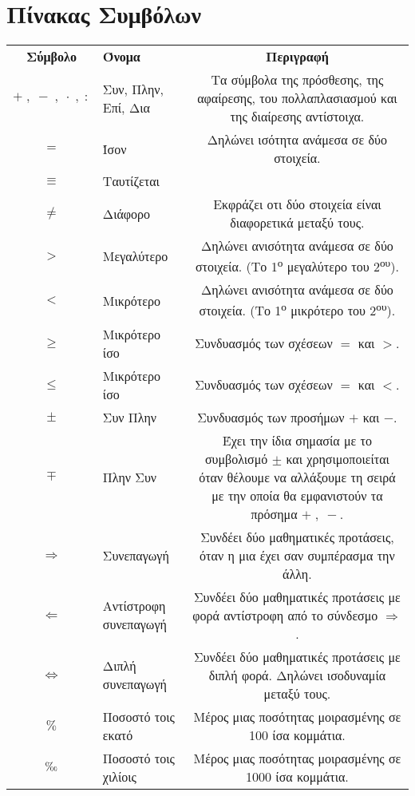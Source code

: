 \documentclass[twoside,10pt]{book}
\DeclareRobustCommand{\perthousand}{%
\ifmmode
\text{\textperthousand}%
\else
\textperthousand
\fi}
\begin{document}
\chapter*{Πίνακας Συμβόλων}
{\par\centering

\begin{tabularx}{\textwidth}{c>{\centering}m{3.1cm}C}
\hline\rule[-2ex]{0pt}{5.5ex}\textbf{Σύμβολο} & \textbf{Όνομα} & \textbf{Περιγραφή}\\
\hhline{===}\rule[-2ex]{0pt}{8.5ex}
$ +\;,\; -\;,\; \cdot\;,\; : $ &  Συν, Πλην, Επί, Δια & Τα σύμβολα της πρόσθεσης, της αφαίρεσης, του πολλαπλασιασμού και της διαίρεσης αντίστοιχα.\\
\rule[-2ex]{0pt}{5.5ex}
$ = $ & Ίσον & Δηλώνει ισότητα ανάμεσα σε δύο στοιχεία.\\
\rule[-2ex]{0pt}{5.5ex}
$ \equiv $ & Ταυτίζεται & \\
\rule[-2ex]{0pt}{5.5ex}
$ \neq $ & Διάφορο & Εκφράζει οτι δύο στοιχεία είναι διαφορετικά μεταξύ τους.\\
\rule[-2ex]{0pt}{5.5ex}
$ > $ & Μεγαλύτερο & Δηλώνει ανισότητα ανάμεσα σε δύο στοιχεία. (Το 1\textsuperscript{ο} μεγαλύτερο του 2\textsuperscript{ου}).\\
\rule[-2ex]{0pt}{5.5ex}
$ < $ & Μικρότερο & Δηλώνει ανισότητα ανάμεσα σε δύο στοιχεία. (Το 1\textsuperscript{ο} μικρότερο του 2\textsuperscript{ου}).\\
\rule[-2ex]{0pt}{5.5ex}
$ \geq $ & Μικρότερο ίσο & Συνδυασμός των σχέσεων $=$ και $>$.\\
\rule[-2ex]{0pt}{5.5ex}
$ \leq $ & Μικρότερο ίσο & Συνδυασμός των σχέσεων $=$ και $<$.\\
\rule[-2ex]{0pt}{5.5ex}
$ \pm $ & Συν Πλην & Συνδυασμός των προσήμων $+$ και $-$.\\
\rule[-2ex]{0pt}{5.5ex}
$ \mp $ & Πλην Συν & Έχει την ίδια σημασία με το συμβολισμό $\pm$  και χρησιμοποιείται όταν θέλουμε να αλλάξουμε τη σειρά με την οποία θα εμφανιστούν τα πρόσημα $+\;,\;-$. \\
\rule[-2ex]{0pt}{7ex}
$ \Rightarrow $ & Συνεπαγωγή & Συνδέει δύο μαθηματικές προτάσεις, όταν η μια έχει σαν συμπέρασμα την άλλη. \\
\rule[-2ex]{0pt}{7ex}
$ \Leftarrow $ & Αντίστροφη συνεπαγωγή & Συνδέει δύο μαθηματικές προτάσεις με φορά αντίστροφη από το σύνδεσμο $ \Rightarrow $. \\
\rule[-2ex]{0pt}{7ex}
$ \Leftrightarrow $ & Διπλή συνεπαγωγή & Συνδέει δύο μαθηματικές προτάσεις με διπλή φορά. Δηλώνει ισοδυναμία μεταξύ τους.  \\
\rule[-2ex]{0pt}{7ex}
$ \% $ & Ποσοστό τοις εκατό & Μέρος μιας ποσότητας μοιρασμένης σε 100 ίσα κομμάτια. \\
\rule[-2ex]{0pt}{7ex}
$ \perthousand $ & Ποσοστό τοις χιλίοις & Μέρος μιας ποσότητας μοιρασμένης σε 1000 ίσα κομμάτια. \\
\hline
\end{tabularx}
\par}
\end{document}
